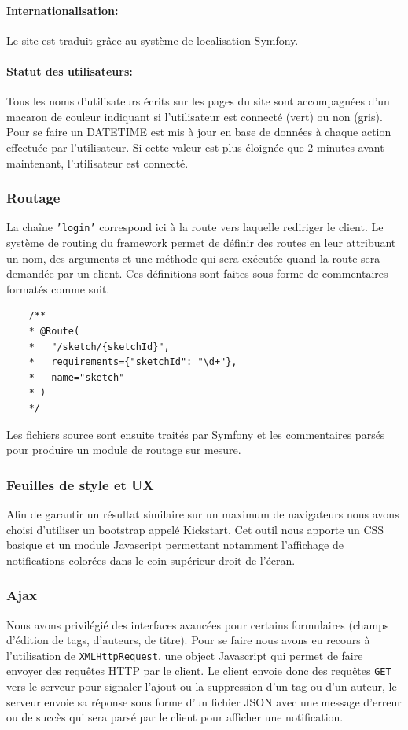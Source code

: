 \documentclass[a4paper]{article}
\begin{document}
\paragraph{Internationalisation: }Le site est traduit grâce au système de localisation Symfony.
\paragraph{Statut des utilisateurs: }Tous les noms d'utilisateurs écrits sur les pages du site sont accompagnées d'un macaron de couleur indiquant si l'utilisateur est connecté (vert) ou non (gris). Pour se faire un DATETIME est mis à jour en base de données à chaque action effectuée par l'utilisateur. Si cette valeur est plus éloignée que 2 minutes avant maintenant, l'utilisateur est connecté.


\subsubsection{Routage}
La chaîne \texttt{'login'} correspond ici à la route vers laquelle rediriger le client. Le système de routing du framework permet de définir des routes en leur attribuant un nom, des arguments et une méthode qui sera exécutée quand la route sera demandée par un client. Ces définitions sont faites sous forme de commentaires formatés comme suit.
\begin{lstlisting}
	/**
	* @Route(
	*   "/sketch/{sketchId}",
	*   requirements={"sketchId": "\d+"},
	*   name="sketch"
	* )
	*/
\end{lstlisting}
Les fichiers source sont ensuite traités par Symfony et les commentaires parsés pour produire un module de routage sur mesure.

\subsubsection{Feuilles de style et UX}
Afin de garantir un résultat similaire sur un maximum de navigateurs nous avons choisi d'utiliser un bootstrap appelé Kickstart. Cet outil nous apporte un CSS basique et un module Javascript permettant notamment l'affichage de notifications colorées dans le coin supérieur droit de l'écran.

\subsubsection{Ajax}
Nous avons privilégié des interfaces avancées pour certains formulaires (champs d'édition de tags, d'auteurs, de titre). Pour se faire nous avons eu recours à l'utilisation de \texttt{XMLHttpRequest}, une object Javascript qui permet de faire envoyer des requêtes HTTP par le client. Le client envoie donc des requêtes \texttt{GET} vers le serveur pour signaler l'ajout ou la suppression d'un tag ou d'un auteur, le serveur envoie sa réponse sous forme d'un fichier JSON avec une message d'erreur ou de succès qui sera parsé par le client pour afficher une notification.
\end{document}
